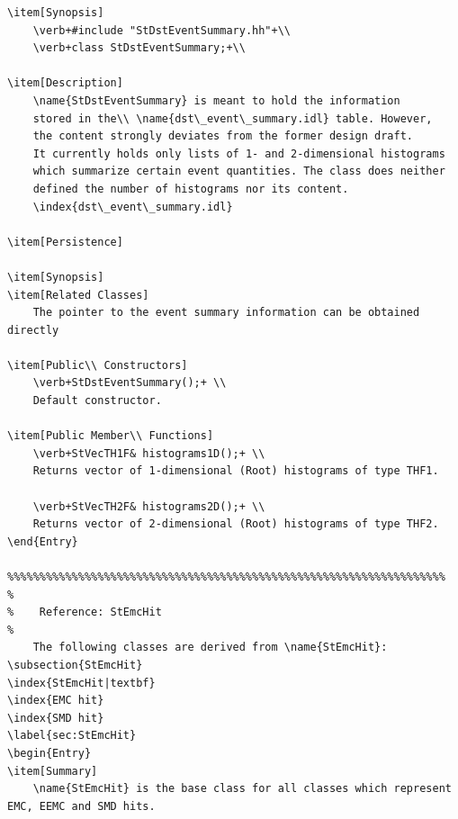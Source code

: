 \begin{enumerate}
{\begin{verbatim}
\item[Synopsis]
    \verb+#include "StDstEventSummary.hh"+\\
    \verb+class StDstEventSummary;+\\

\item[Description]
    \name{StDstEventSummary} is meant to hold the information
    stored in the\\ \name{dst\_event\_summary.idl} table. However,
    the content strongly deviates from the former design draft.
    It currently holds only lists of 1- and 2-dimensional histograms
    which summarize certain event quantities. The class does neither
    defined the number of histograms nor its content.
    \index{dst\_event\_summary.idl}

\item[Persistence]
    
\item[Synopsis] 
\item[Related Classes]
    The pointer to the event summary information can be obtained directly
    
\item[Public\\ Constructors]
    \verb+StDstEventSummary();+ \\
    Default constructor.

\item[Public Member\\ Functions]
    \verb+StVecTH1F& histograms1D();+ \\
    Returns vector of 1-dimensional (Root) histograms of type THF1.

    \verb+StVecTH2F& histograms2D();+ \\
    Returns vector of 2-dimensional (Root) histograms of type THF2.
\end{Entry}
    
%%%%%%%%%%%%%%%%%%%%%%%%%%%%%%%%%%%%%%%%%%%%%%%%%%%%%%%%%%%%%%%%%%%%
%
%    Reference: StEmcHit
%
    The following classes are derived from \name{StEmcHit}: 
\subsection{StEmcHit}
\index{StEmcHit|textbf}
\index{EMC hit}
\index{SMD hit}
\label{sec:StEmcHit}
\begin{Entry}
\item[Summary]
    \name{StEmcHit} is the base class for all classes which represent EMC, EEMC and SMD hits.


\end{verbatim}}
\end{enumerate}
